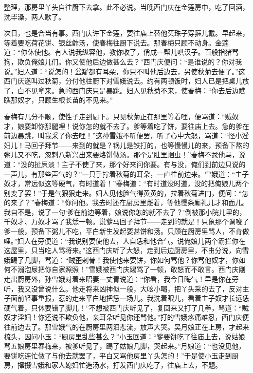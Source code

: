 整理，那房里丫头自往厨下去拿。此不必说。当晚西门庆在金莲房中，吃了回酒，洗毕澡，两人歇了。

次日，也是合当有事。西门庆许下金莲，要往庙上替他买珠子穿箍儿戴。早起来，等着要吃荷花饼、银丝鲊汤，使春梅往厨下说去。那春梅只顾不动身。金莲道：“你休使他。有人说我纵容他，教你收了，俏成一帮儿哄汉子。百般指猪骂狗，欺负俺娘儿们。你又使他后边做甚么去？”西门庆便问：“是谁说的？你对我说。”妇人道：“说怎的！盆罐都有耳朵，你只不叫他后边去，另使秋菊去便了。”这西门庆遂叫过秋菊，分付他往厨下对雪娥说去。约有两顿饭时，妇人已是把桌儿放了，白不见拿来。急的西门庆只是暴跳。妇人见秋菊不来，使春梅：“你去后边瞧瞧那奴才，只顾生根长苗的不见来。”

春梅有几分不顺，使性子走到厨下。只见秋菊正在那里等着哩，便骂道：“贼奴才，娘要卸你那腿哩！说你怎的就不去了。爹等着吃了饼，要往庙上去。急的爹在前边暴跳，叫我采了你去哩！”这孙雪娥不听便罢，听了心中大怒，骂道：“怪小淫妇儿！马回子拜节——来到的就是？锅儿是铁打的，也等慢慢儿的来，预备下熬的粥儿又不吃，忽剌八新兴出来要烙饼做汤。那个是肚里蛔虫！”春梅不忿他骂，说道：“没的扯屄淡！主子不使了来，那个好来问你要。有与没，俺们到前边只说的一声儿，有那些声气的？”一只手拧着秋菊的耳朵，一直往前边来。雪娥道：“主子奴才，常远似这等硬气，有时道着！”春梅道：“有时道没时道，没的把俺娘儿两个别变了罢！”于是气狠狠走来。妇人见他脸气得黄黄的，拉着秋菊进门，便问：“怎的来了？”春梅道：“你问他。我去时还在厨房里雌着，等他慢条厮礼儿才和面儿。我自不是，说了一句‘爹在前边等着，娘说你怎的就不去了？’倒被那小院儿里的，千奴才、万奴才骂了我恁一顿。说爹马回子拜节——走到的就是！只象那个调唆了爹一般，预备下粥儿不吃，平白新生发起要甚饼和汤。只顾在厨房里骂人，不肯做哩。”妇人在旁便道：“我说别要使他去，人自恁和他合气。说俺娘儿两个霸拦你在这屋里，只当吃人骂将来。”这西门庆听了大怒，走到后边厨房里，不由分说，向雪娥踢了几脚，骂道：“贼歪剌骨！我使他来要饼，你如何骂他？你骂他奴才，你如何不溺泡尿把你自家照照！”雪娥被西门庆踢骂了一顿，敢怒而不敢言。西门庆刚走出厨房外，孙雪娥对着来昭妻一丈青说道：“你看，我今日晦气！早是你在旁听，我又没曾说什么。他走将来凶神似一般，大吆小喝，把丫头采的去了，反对主子面前轻事重报，惹的走来平白地把恁一场儿。我洗着眼儿，看着主子奴才长远恁硬气着，只休要错了脚儿！”不想被西门庆听见了，复回来又打了几拳，骂道：“贼奴才淫妇！你还说不欺负他，亲耳朵听见你还骂他。”打的雪娥疼痛难忍，西门庆便往前边去了。那雪娥气的在厨房里两泪悲流，放声大哭。吴月娘正在上房，才起来梳头，因问小玉：“厨房里乱些甚么？”小玉回道：“爹要饼吃了往庙上去，说姑娘骂五娘房里春梅来，被爹听见了，踢了姑娘几脚，哭起来。”月娘道：“也没见他，要饼吃连忙做了与他去就罢了，平白又骂他房里丫头怎的！”于是使小玉走到厨房，撺掇雪娥和家人媳妇忙造汤水，打发西门庆吃了，往庙上去，不题。

